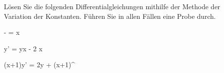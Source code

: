 \begin{atiTask}[
	title = Die Methode der Variation der Konstanten
]
	Lösen Sie die folgenden Differentialgleichungen mithilfe der Methode der Variation der Konstanten.
	Führen Sie in allen Fällen eine Probe durch.
	\begin{atiSubequations}
		\item{
			 -  = \sin x
		}
		\item{
			y' = y\sin x - 2 \sin x
		}
		\item{
			(x+1)y' = 2y + (x+1)^{}
		}
	\end{atiSubequations}
\end{atiTask}